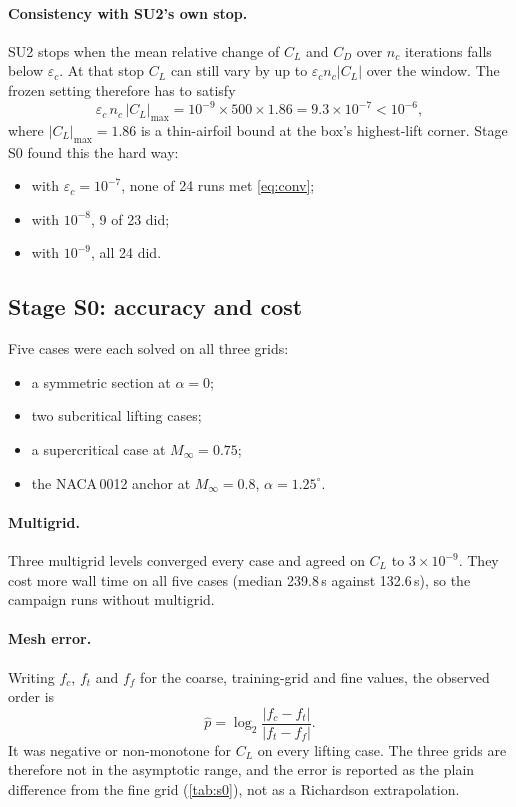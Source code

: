 \documentclass[11pt]{article}
\newcommand{\Ma}{M_\infty}
\newcommand{\CL}{C_L}
\newcommand{\CD}{C_D}
\begin{document}
\paragraph{Consistency with SU2's own stop.}
SU2 stops when the mean relative change of $\CL$ and $\CD$ over $n_c$ iterations falls below
$\varepsilon_c$. At that stop $\CL$ can still vary by up to $\varepsilon_c n_c|\CL|$ over the
window. The frozen setting therefore has to satisfy
\begin{equation}
  \varepsilon_c\, n_c\, |\CL|_{\max} = 10^{-9}\times500\times1.86 = 9.3\times10^{-7} < 10^{-6},
\end{equation}
where $|\CL|_{\max} = 1.86$ is a thin-airfoil bound at the box's highest-lift corner. Stage S0 found
this the hard way:
\begin{itemize}
  \item with $\varepsilon_c = 10^{-7}$, none of 24 runs met \cref{eq:conv};
  \item with $10^{-8}$, 9 of 23 did;
  \item with $10^{-9}$, all 24 did.
\end{itemize}

\subsection{Stage S0: accuracy and cost}

Five cases were each solved on all three grids:
\begin{itemize}
  \item a symmetric section at $\alpha = 0$;
  \item two subcritical lifting cases;
  \item a supercritical case at $\Ma = 0.75$;
  \item the NACA\,0012 anchor at $\Ma = 0.8$, $\alpha = 1.25^\circ$.
\end{itemize}

\paragraph{Multigrid.}
Three multigrid levels converged every case and agreed on $\CL$ to $3\times10^{-9}$. They cost more
wall time on all five cases (median 239.8\,s against 132.6\,s), so the campaign runs without
multigrid.

\paragraph{Mesh error.}
Writing $f_c$, $f_t$ and $f_f$ for the coarse, training-grid and fine values, the observed order is
\begin{equation}
  \hat p = \log_2\frac{|f_c - f_t|}{|f_t - f_f|}.
\end{equation}
It was negative or non-monotone for $\CL$ on every lifting case. The three grids are therefore not
in the asymptotic range, and the error is reported as the plain difference from the fine grid
(\cref{tab:s0}), not as a Richardson extrapolation.
\end{document}
